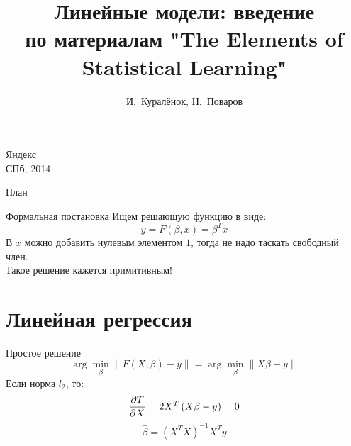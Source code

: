 \documentclass[14pt, fleqn, xcolor={dvipsnames, table}]{beamer}
\title{Линейные модели: введение\\\small{по материалам "The Elements of Statistical Learning"}}
\author[]{\small{%
И.~Куралёнок,
Н.~Поваров}}
\date{}
\begin{document}
\begin{frame}
\maketitle
\small
\begin{center}
\vspace{-60pt}
\normalsize {\color{red}Я}ндекс \\
\vspace{80pt}
\footnotesize СПб, 2014
\end{center}
\end{frame}


\begin{frame}{План}
\tableofcontents
\end{frame}

\begin{frame}{Формальная постановка}
Ищем решающую функцию в виде:
$$
y = F(\beta, x) = \beta^T x
$$
В $x$ можно добавить нулевым элементом $1$, тогда не надо таскать свободный член. \\
Такое решение кажется примитивным! \\
\end{frame}

\section{Линейная регрессия}
\begin{frame}{Простое решение}
$$
\arg \min_{\beta} \|F(X, \beta) - y\| = \arg \min_{\beta} \|X \beta - y\|
$$
Если норма $l_2$, то:
$$
{\partial T \over \partial X} = 2 X^T\left(X\beta - y\right) = 0
$$
$$
\hat{\beta} = (X^TX)^{-1}X^Ty
$$
\end{frame}
\end{document}
